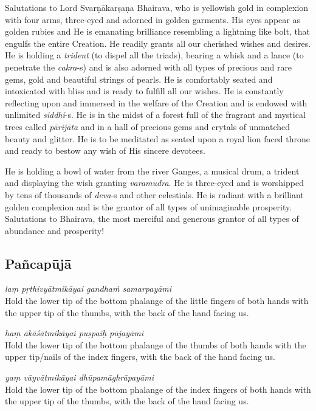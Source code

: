 \documentclass[11pt,oneside,a4paper]{article}
\newcommand{\tl}[1]{\emph{#1}}
\begin{document}
Salutations to Lord Svarṇākarṣaṇa Bhairava, who is yellowish gold in complexion
with four arms, three-eyed and adorned in golden garments. His eyes appear as
golden rubies and He is emanating brilliance resembling a lightning like bolt,
that engulfs the entire Creation. He readily grants all our cherished wishes
and desires. He is holding a \tl{trident} (to dispel all the triads), bearing
a whisk and a lance (to penetrate the \tl{cakra}-s) and is also adorned with all
types of precious and rare gems, gold and beautiful strings of pearls. He is
comfortably seated and intoxicated with bliss and is ready to fulfill all our
wishes. He is constantly reflecting upon and immersed in the welfare of the
Creation and is endowed with unlimited \tl{siddhi}-s. He is in the midst of
a forest full of the fragrant and mystical trees called \tl{pārijāta} and in
a hall of precious gems and crytals of unmatched beauty and glitter. He is to
be meditated as seated upon a royal lion faced throne and ready to bestow any
wish of His sincere devotees.

He is holding a bowl of water from the river Ganges, a musical drum, a trident
and displaying the wish granting \tl{varamudra}. He is three-eyed and is
worshipped by tens of thousands of \tl{deva}-s and other celestials. He is
radiant with a brilliant golden complexion and is the grantor of all types of
unimaginable prosperity. Salutations to Bhairava, the most merciful and generous
grantor of all types of abundance and prosperity!

\subsection{Pañcapūjā}

\tl{laṃ pṛthivyātmikāyai gandhaṁ samarpayāmi}\\
Hold the lower tip of the bottom phalange of the little fingers of both hands
with the upper tip of the thumbs, with the back of the hand facing us.

\tl{haṃ ākāśātmikāyai puṣpaiḥ pūjayāmi}\\
Hold the lower tip of the bottom phalange of the thumbs of both hands with
the upper tip/nails of the index fingers, with the back of the hand facing us.

\tl{yaṃ vāyvātmikāyai dhūpamāghrāpayāmi}\\
Hold the lower tip of the bottom phalange of the index fingers of both hands
with the upper tip of the thumbs, with the back of the hand facing us.
\end{document}
